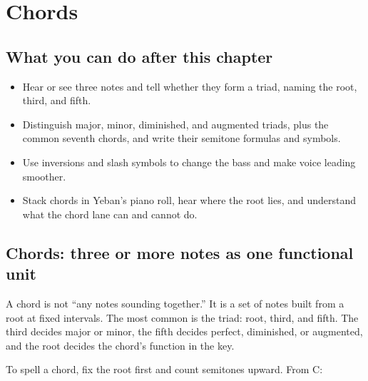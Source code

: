 \clearpage
\chapter{Chords}


\label{sec:chords}

\section*{What you can do after this chapter}
\begin{itemize}
  \item Hear or see three notes and tell whether they form a triad, naming the root, third, and fifth.
  \item Distinguish major, minor, diminished, and augmented triads, plus the common seventh chords, and write their semitone formulas and symbols.
  \item Use inversions and slash symbols to change the bass and make voice leading smoother.
  \item Stack chords in Yeban's piano roll, hear where the root lies, and understand what the chord lane can and cannot do.
\end{itemize}

\section{Chords: three or more notes as one functional unit}

A chord is not ``any notes sounding together.'' It is a set of notes built from a root at fixed intervals. The most common is the triad: root, third, and fifth. The third decides major or minor, the fifth decides perfect, diminished, or augmented, and the root decides the chord's function in the key.

To spell a chord, fix the root first and count semitones upward. From C:


